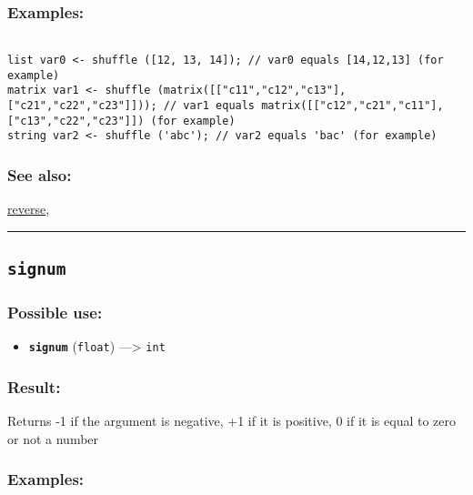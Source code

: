 \documentclass[]{book}
\providecommand{\tightlist}{%
  \setlength{\itemsep}{0pt}\setlength{\parskip}{0pt}}
\theoremstyle{definition}
\theoremstyle{definition}
\theoremstyle{definition}
\theoremstyle{remark}
\begin{document}
\subsubsection{Examples:}\label{examples-327}

\begin{verbatim}
 
list var0 <- shuffle ([12, 13, 14]); // var0 equals [14,12,13] (for example) 
matrix var1 <- shuffle (matrix([["c11","c12","c13"],["c21","c22","c23"]])); // var1 equals matrix([["c12","c21","c11"],["c13","c22","c23"]]) (for example) 
string var2 <- shuffle ('abc'); // var2 equals 'bac' (for example)
\end{verbatim}

\subsubsection{See also:}\label{see-also-183}

\href{OperatorsNR\#reverse}{reverse},

\begin{center}\rule{0.5\linewidth}{\linethickness}\end{center}

\subsection{\texorpdfstring{\texttt{signum}}{signum}}\label{signum}

\subsubsection{Possible use:}\label{possible-use-472}

\begin{itemize}
\tightlist
\item
  \textbf{\texttt{signum}} (\texttt{float}) ---\textgreater{}
  \texttt{int}
\end{itemize}

\subsubsection{Result:}\label{result-456}

Returns -1 if the argument is negative, +1 if it is positive, 0 if it is
equal to zero or not a number

\subsubsection{Examples:}\label{examples-328}
\end{document}
